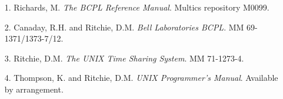 \documentclass[12pt]{report}
\begin{document}

\begin{enumerate}
\item[1.] Richards, M. \emph{The BCPL Reference Manual}. Multics
  repository M0099.
\item[2.] Canaday, R.H. and Ritchie, D.M. \emph{Bell Laboratories BCPL}. MM
  69-1371/1373-7/12.
\item[3.] Ritchie, D.M. \emph{The UNIX Time Sharing System}. MM 71-1273-4.
\item[4.] Thompson, K. and Ritchie, D.M. \emph{UNIX Programmer's
    Manual}. Available by arrangement.
\end{enumerate}
\end{document}
